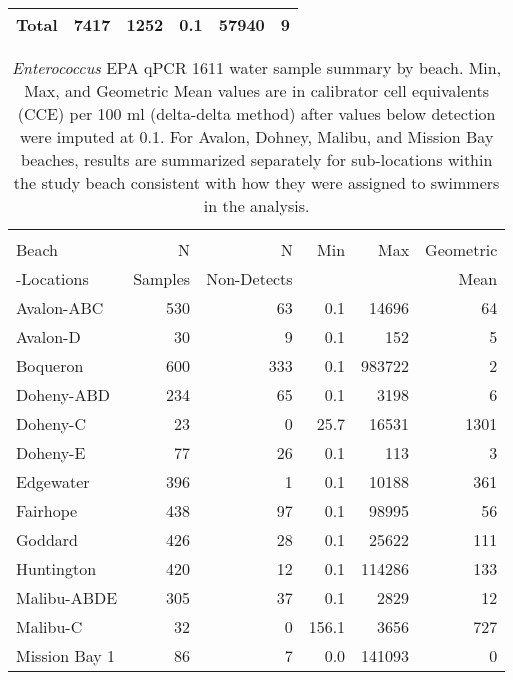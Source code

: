 \documentclass[12pt]{article}\usepackage[]{graphicx}\usepackage[]{color}
\begin{document}
\begin{table}[h!tb]
\begin{center}
\begin{tabular}{l rrrrr}
\hline
 Total & 7417 & 1252 & 0.1 & 57940 & 9 \\ 
  
\hline
\end{tabular}
\end{center}
\end{table}


\begin{table}[h!tb]
\begin{center}
\caption{\textit{Enterococcus} EPA qPCR 1611 water sample summary by beach. Min, Max, and Geometric Mean values are in calibrator cell equivalents (CCE) per 100 ml (delta-delta method) after values below detection were imputed at 0.1. For Avalon, Dohney, Malibu, and Mission Bay beaches, results are summarized separately for sub-locations within the study beach consistent with how they were assigned to swimmers in the analysis. \label{tab:wq1611}}
\begin{tabular}{l rrrrr}
 & \\
Beach              & N       & N           & Min & Max & Geometric  \\
-Locations & Samples & Non-Detects &     &     & Mean \\
\hline
 Avalon-ABC & 530 & 63 & 0.1 & 14696 & 64 \\ 
  Avalon-D & 30 & 9 & 0.1 & 152 & 5 \\ 
  Boqueron & 600 & 333 & 0.1 & 983722 & 2 \\ 
  Doheny-ABD & 234 & 65 & 0.1 & 3198 & 6 \\ 
  Doheny-C & 23 & 0 & 25.7 & 16531 & 1301 \\ 
  Doheny-E & 77 & 26 & 0.1 & 113 & 3 \\ 
  Edgewater & 396 & 1 & 0.1 & 10188 & 361 \\ 
  Fairhope & 438 & 97 & 0.1 & 98995 & 56 \\ 
  Goddard & 426 & 28 & 0.1 & 25622 & 111 \\ 
  Huntington & 420 & 12 & 0.1 & 114286 & 133 \\ 
  Malibu-ABDE & 305 & 37 & 0.1 & 2829 & 12 \\ 
  Malibu-C & 32 & 0 & 156.1 & 3656 & 727 \\ 
  Mission Bay 1 & 86 & 7 & 0.0 & 141093 & 0 \\ 

\end{tabular}
\end{center}
\end{table}
\end{document}
